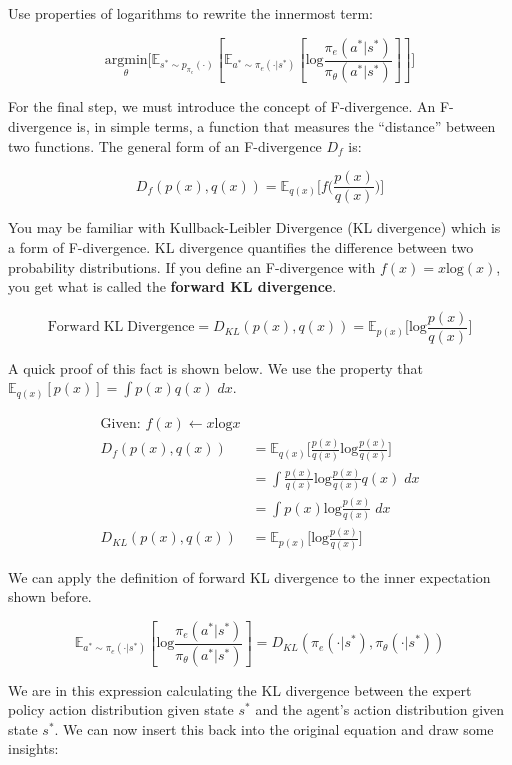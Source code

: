 \begin{flushleft}
    Use properties of logarithms to rewrite the innermost term:

    $$\underset{\theta}{\textrm{argmin}}\biggl[\mathbb{E}_{s^* \sim p_{\pi_e}(\cdot)}[\mathbb{E}_{a^* \sim \pi_e(\cdot|s^*)}[\mathrm{log}\frac{\pi_e(a^*|s^*)}{\pi_\theta(a^*|s^*)}]]\biggr]$$

    For the final step, we must introduce the concept of F-divergence. An F-divergence is, in simple terms, a function that measures the ``distance'' between two functions. The general form of an F-divergence $D_f$ is:

    $$D_f(p(x),q(x)) = \mathbb{E}_{q(x)} \biggl[ f\biggl( \frac{p(x)}{q(x)}\biggr)\biggr]$$
    
    You may be familiar with Kullback-Leibler Divergence (KL divergence) which is a form of F-divergence. KL divergence quantifies the difference between two probability distributions. If you define an F-divergence with $f(x) = x\mathrm{log}(x)$, you get what is called the \textbf{forward KL divergence}.
    
    $$\mathrm{Forward\;KL\;Divergence} = D_{KL}(p(x),q(x)) = \mathbb{E}_{p(x)} \biggl[\mathrm{log}\frac{p(x)}{q(x)}\biggr]$$
    
    A quick proof of this fact is shown below. We use the property that $\mathbb{E}_{q(x)}[p(x)] = \int p(x)q(x)\;dx$.

    \begin{align*}
        \textrm{Given: }f(x) \leftarrow x\mathrm{log}x \\
        D_f(p(x),q(x))\ &= \mathbb{E}_{q(x)} \biggl[ \frac{p(x)}{q(x)}\mathrm{log}\frac{p(x)}{q(x)}\biggr]\\
        &= \int \frac{p(x)}{q(x)}\mathrm{log}\frac{p(x)}{q(x)}q(x)\;dx\\
        &= \int p(x)\mathrm{log}\frac{p(x)}{q(x)}\;dx\\
        D_{KL}(p(x),q(x)) &= \mathbb{E}_{p(x)} \biggl[\mathrm{log}\frac{p(x)}{q(x)}\biggr]
    \end{align*}

    We can apply the definition of forward KL divergence to the inner expectation shown before.

    $$\mathbb{E}_{a^* \sim \pi_e(\cdot|s^*)}[\mathrm{log}\frac{\pi_e(a^*|s^*)}{\pi_\theta(a^*|s^*)}] = D_{KL}(\pi_e(\cdot|s^*),\pi_\theta(\cdot|s^*))$$

    We are in this expression calculating the KL divergence between the expert policy action distribution given state $s^*$ and the agent's action distribution given state $s^*$. We can now insert this back into the original equation and draw some insights:


\end{flushleft}
